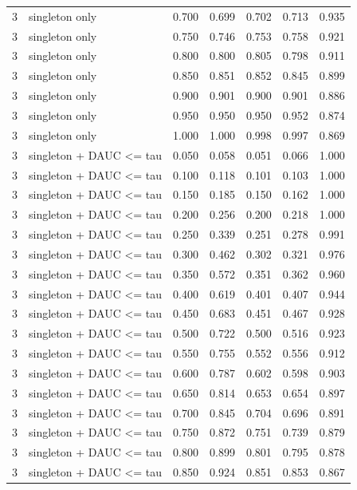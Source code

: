 \begin{tabular}{rlrrrrr}
3 & singleton only & 0.700 & 0.699 & 0.702 & 0.713 & 0.935 \\
3 & singleton only & 0.750 & 0.746 & 0.753 & 0.758 & 0.921 \\
3 & singleton only & 0.800 & 0.800 & 0.805 & 0.798 & 0.911 \\
3 & singleton only & 0.850 & 0.851 & 0.852 & 0.845 & 0.899 \\
3 & singleton only & 0.900 & 0.901 & 0.900 & 0.901 & 0.886 \\
3 & singleton only & 0.950 & 0.950 & 0.950 & 0.952 & 0.874 \\
3 & singleton only & 1.000 & 1.000 & 0.998 & 0.997 & 0.869 \\
3 & singleton + DAUC <= tau & 0.050 & 0.058 & 0.051 & 0.066 & 1.000 \\
3 & singleton + DAUC <= tau & 0.100 & 0.118 & 0.101 & 0.103 & 1.000 \\
3 & singleton + DAUC <= tau & 0.150 & 0.185 & 0.150 & 0.162 & 1.000 \\
3 & singleton + DAUC <= tau & 0.200 & 0.256 & 0.200 & 0.218 & 1.000 \\
3 & singleton + DAUC <= tau & 0.250 & 0.339 & 0.251 & 0.278 & 0.991 \\
3 & singleton + DAUC <= tau & 0.300 & 0.462 & 0.302 & 0.321 & 0.976 \\
3 & singleton + DAUC <= tau & 0.350 & 0.572 & 0.351 & 0.362 & 0.960 \\
3 & singleton + DAUC <= tau & 0.400 & 0.619 & 0.401 & 0.407 & 0.944 \\
3 & singleton + DAUC <= tau & 0.450 & 0.683 & 0.451 & 0.467 & 0.928 \\
3 & singleton + DAUC <= tau & 0.500 & 0.722 & 0.500 & 0.516 & 0.923 \\
3 & singleton + DAUC <= tau & 0.550 & 0.755 & 0.552 & 0.556 & 0.912 \\
3 & singleton + DAUC <= tau & 0.600 & 0.787 & 0.602 & 0.598 & 0.903 \\
3 & singleton + DAUC <= tau & 0.650 & 0.814 & 0.653 & 0.654 & 0.897 \\
3 & singleton + DAUC <= tau & 0.700 & 0.845 & 0.704 & 0.696 & 0.891 \\
3 & singleton + DAUC <= tau & 0.750 & 0.872 & 0.751 & 0.739 & 0.879 \\
3 & singleton + DAUC <= tau & 0.800 & 0.899 & 0.801 & 0.795 & 0.878 \\
3 & singleton + DAUC <= tau & 0.850 & 0.924 & 0.851 & 0.853 & 0.867 \\

\end{tabular}
